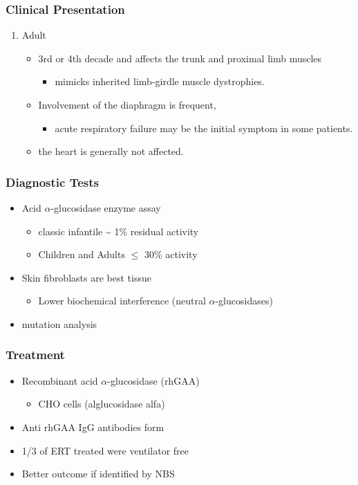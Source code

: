 \documentclass{scrartcl}
\begin{document}
\subsubsection{Clinical Presentation}
\label{sec:orgbc4b9fd}
\begin{enumerate}
\item Adult
\label{sec:org63cf6b0}
\begin{itemize}
\item 3rd or 4th decade and affects the trunk and proximal limb muscles
\begin{itemize}
\item mimicks inherited limb-girdle muscle dystrophies.
\end{itemize}
\item Involvement of the diaphragm is frequent,
\begin{itemize}
\item acute respiratory failure may be the initial symptom in some patients.
\end{itemize}
\item the heart is generally not affected.
\end{itemize}
\end{enumerate}
\subsubsection{Diagnostic Tests}
\label{sec:orge8eba9b}
\begin{itemize}
\item Acid \(\alpha\)-glucosidase enzyme assay
\begin{itemize}
\item classic infantile \textasciitilde{} 1\% residual activity
\item Children and Adults \(\le\) 30\% activity
\end{itemize}
\item Skin fibroblasts are best tissue
\begin{itemize}
\item Lower biochemical interference (neutral \(\alpha\)-glucosidases)
\end{itemize}
\item mutation analysis
\end{itemize}
\subsubsection{Treatment}
\label{sec:org6c1f7c5}
\begin{itemize}
\item Recombinant acid \(\alpha\)-glucosidase (rhGAA)
\begin{itemize}
\item CHO cells (alglucosidase alfa)
\end{itemize}
\item Anti rhGAA IgG antibodies form
\item 1/3 of ERT treated were ventilator free
\item Better outcome if identified by NBS
\end{itemize}
\end{document}
